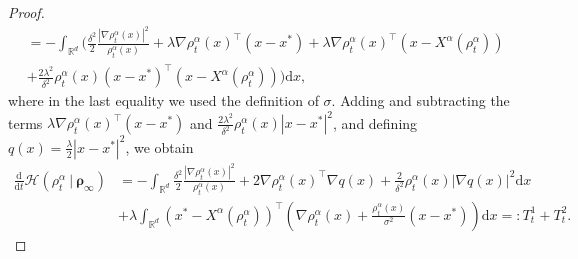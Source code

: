 \documentclass[reqno]{amsart}
\numberwithin{algorithm}{section}
\newcommand{\diff}{\mathrm{d}}
\newcommand{\Xalpha}{{X^\alpha}}
\begin{document}
{\begin{proof}
\begin{equation*}
\begin{aligned}
        &= -\int_{\mathbb{R}^d}\Bigg(\frac{\delta^2}{2}\frac{|\nabla \rho^\alpha_t(x)|^2}{\rho^\alpha_t(x)} + \lambda \nabla\rho^\alpha_t(x)^\top(x-x^*)+ \lambda \nabla\rho^\alpha_t(x)^\top(x-\Xalpha(\rho^\alpha_t)) \\
        &+ \frac{2\lambda^2}{\delta^2}\rho^\alpha_t(x)(x-x^*)^\top(x-\Xalpha(\rho^\alpha_t))\Bigg) \diff x,
    \end{aligned}\end{equation*}
    where in the last equality we used the definition of $\sigma$.
    Adding and subtracting the terms $\lambda\nabla\rho^\alpha_t(x)^\top(x-x^*)$ and $\frac{2\lambda^2}{\delta^2}\rho^\alpha_t(x) |x-x^*|^2$, and defining $q(x) = \frac{\lambda}{2} |x-x^*|^2$, we obtain
    \begin{equation}\label{eq:dtH1}\begin{aligned}
         \frac{\diff}{\diff t}\mathcal H(\rho^\alpha_t\ | \ \boldsymbol\rho_\infty) &= -\int_{\mathbb{R}^d}\frac{\delta^2}{2}\frac{|\nabla \rho^\alpha_t(x)|^2}{\rho^\alpha_t(x)} + 2\nabla\rho^\alpha_t(x)^\top\nabla q(x) + \frac{2}{\delta^2}\rho^\alpha_t(x)|\nabla q(x)|^2\diff x\\
         &+ \lambda \int_{\mathbb{R}^d}(x^*-\Xalpha(\rho^\alpha_t))^\top\left(\nabla\rho^\alpha_t(x)+\frac{\rho^\alpha_t(x)}{\sigma^2}(x-x^*)\right) \diff x  =: T^1_t+T^2_t.
    \end{aligned}\end{equation}


\end{proof}}
\end{document}
